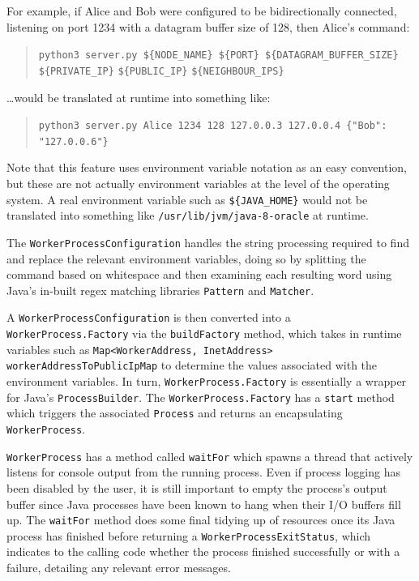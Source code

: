 For example, if Alice and Bob were configured to be bidirectionally connected, listening on port 1234 with a datagram
buffer size of 128, then Alice's command:
\begin{quote}
    \texttt{python3 server.py \$\{NODE\_NAME\} \$\{PORT\} \$\{DATAGRAM\_BUFFER\_SIZE\} \$\{PRIVATE\_IP\}}
    \texttt{\$\{PUBLIC\_IP\}} \texttt{\$\{NEIGHBOUR\_IPS\}}
\end{quote}
\noindent
\ldots would be translated at runtime into something like:
\begin{quote}
    \texttt{python3 server.py Alice 1234 128 127.0.0.3 127.0.0.4 \{"Bob": "127.0.0.6"\}}
\end{quote}

Note that this feature uses environment variable notation as an easy convention, but these are not actually
environment variables at the level of the operating system. A real environment variable such as
\texttt{\$\{JAVA\_HOME\}} would not be translated into something like \texttt{/usr/lib/jvm/java-8-oracle} at runtime.

The \texttt{WorkerProcessConfiguration} handles the string processing required to find and replace the relevant
environment variables, doing so by splitting the command based on whitespace and then examining each resulting word
using Java's in-built regex matching libraries \texttt{Pattern}\cite{java_Pattern} and
\texttt{Matcher}\cite{java_Matcher}.

A \texttt{WorkerProcessConfiguration} is then converted into a \texttt{WorkerProcess.Factory} via the
\texttt{buildFactory} method, which takes in runtime variables such as \texttt{Map<WorkerAddress, InetAddress>
    workerAddressToPublicIpMap} to determine the values associated with the environment variables. In turn,
\texttt{WorkerProcess.Factory} is essentially a wrapper for Java's \texttt{ProcessBuilder}\cite{java_ProcessBuilder}.
The \texttt{WorkerProcess.Factory} has a \texttt{start} method which triggers the associated \texttt{Process} and
returns an encapsulating \texttt{WorkerProcess}.

\texttt{WorkerProcess} has a method called \texttt{waitFor} which spawns a thread that actively listens for console
output from the running process. Even if process logging has been disabled by the user, it is still important to
empty the process's output buffer since Java processes have been known to hang when their I/O buffers fill
up\cite{java_process_hang_due_to_buffer_overflow}. The \texttt{waitFor} method does some final tidying up of
resources once its Java process has finished before returning a \texttt{WorkerProcessExitStatus}, which indicates to
the calling code whether the process finished successfully or with a failure, detailing any relevant error messages.

